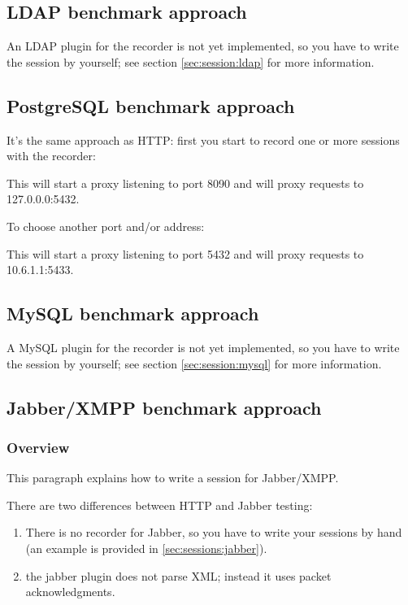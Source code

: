 \documentclass{IDXDOC-en}
\begin{document}
\subsection{LDAP benchmark approach}

An LDAP plugin for the recorder is not yet implemented, so you have to
write the session by yourself; see section \ref{sec:session:ldap} for
more information.

\subsection{PostgreSQL benchmark approach}

It's the same approach as HTTP: first you start to record one or more
sessions with the recorder:

This will start a proxy listening to port 8090 and will proxy requests
to 127.0.0.0:5432.

To choose another port and/or address:

This will start a proxy listening to port 5432 and will proxy requests
to 10.6.1.1:5433.

\subsection{MySQL benchmark approach}

A MySQL plugin for the recorder is not yet implemented, so you have to
write the session by yourself; see section \ref{sec:session:mysql} for
more information.

\subsection{Jabber/XMPP benchmark approach}

\subsubsection{Overview}

This paragraph explains how to write a session for Jabber/XMPP.

There are two differences between HTTP and Jabber testing:
\begin{enumerate}
\item There is no recorder for Jabber, so you have to write your
  sessions by hand (an example is provided in
  \ref{sec:sessions:jabber}).
\item the jabber plugin does not parse XML; instead it uses packet
  acknowledgments.
\end{enumerate}
\end{document}

